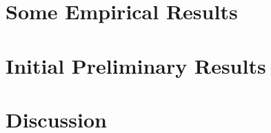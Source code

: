 \documentclass[preprint,10pt,nonatbib]{sigplanconf}
\begin{document}
\section{Some Empirical Results}
\label{section:look}

\section{Initial Preliminary Results}
\label{section:initial}

\section{Discussion}
\label{section:zz}


\small

\end{document}
